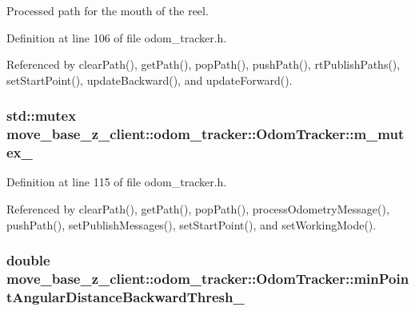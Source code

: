 Processed path for the mouth of the reel. 



Definition at line 106 of file odom\+\_\+tracker.\+h.



Referenced by clear\+Path(), get\+Path(), pop\+Path(), push\+Path(), rt\+Publish\+Paths(), set\+Start\+Point(), update\+Backward(), and update\+Forward().

\subsubsection[{\texorpdfstring{m\+\_\+mutex\+\_\+}{m_mutex_}}]{\setlength{\rightskip}{0pt plus 5cm}std\+::mutex move\+\_\+base\+\_\+z\+\_\+client\+::odom\+\_\+tracker\+::\+Odom\+Tracker\+::m\+\_\+mutex\+\_\+\hspace{0.3cm}{\ttfamily [protected]}}\hypertarget{classmove__base__z__client_1_1odom__tracker_1_1OdomTracker_a63676e03be48b18ac48d5e2f11f19a25}{}\label{classmove__base__z__client_1_1odom__tracker_1_1OdomTracker_a63676e03be48b18ac48d5e2f11f19a25}


Definition at line 115 of file odom\+\_\+tracker.\+h.



Referenced by clear\+Path(), get\+Path(), pop\+Path(), process\+Odometry\+Message(), push\+Path(), set\+Publish\+Messages(), set\+Start\+Point(), and set\+Working\+Mode().

\subsubsection[{\texorpdfstring{min\+Point\+Angular\+Distance\+Backward\+Thresh\+\_\+}{minPointAngularDistanceBackwardThresh_}}]{\setlength{\rightskip}{0pt plus 5cm}double move\+\_\+base\+\_\+z\+\_\+client\+::odom\+\_\+tracker\+::\+Odom\+Tracker\+::min\+Point\+Angular\+Distance\+Backward\+Thresh\+\_\+\hspace{0.3cm}{\ttfamily [protected]}}\hypertarget{classmove__base__z__client_1_1odom__tracker_1_1OdomTracker_ad50ecd0f634a3b9d2f68a54788b8c96a}{}\label{classmove__base__z__client_1_1odom__tracker_1_1OdomTracker_ad50ecd0f634a3b9d2f68a54788b8c96a}



